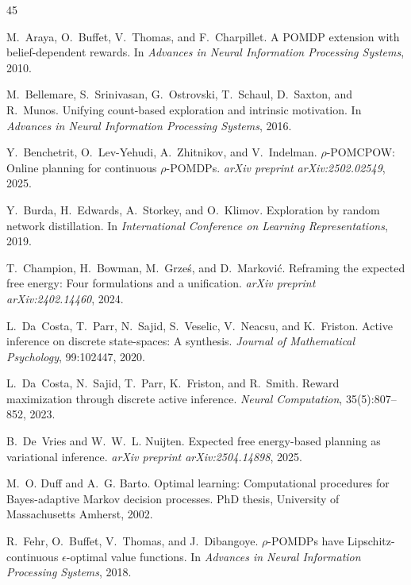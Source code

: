 \documentclass[runningheads]{llncs}
\begin{document}
\begin{thebibliography}{45}

M.~Araya, O.~Buffet, V.~Thomas, and F.~Charpillet.
\newblock A {POMDP} extension with belief-dependent rewards.
\newblock In \emph{Advances in Neural Information Processing Systems}, 2010.

M.~Bellemare, S.~Srinivasan, G.~Ostrovski, T.~Schaul, D.~Saxton, and R.~Munos.
\newblock Unifying count-based exploration and intrinsic motivation.
\newblock In \emph{Advances in Neural Information Processing Systems}, 2016.

Y.~Benchetrit, O.~Lev-Yehudi, A.~Zhitnikov, and V.~Indelman.
\newblock $\rho$-{POMCPOW}: Online planning for continuous $\rho$-{POMDP}s.
\newblock \emph{arXiv preprint arXiv:2502.02549}, 2025.

Y.~Burda, H.~Edwards, A.~Storkey, and O.~Klimov.
\newblock Exploration by random network distillation.
\newblock In \emph{International Conference on Learning Representations}, 2019.

T.~Champion, H.~Bowman, M.~Grze\'{s}, and D.~Markovi\'{c}.
\newblock Reframing the expected free energy: Four formulations and a unification.
\newblock \emph{arXiv preprint arXiv:2402.14460}, 2024.

L.~Da~Costa, T.~Parr, N.~Sajid, S.~Veselic, V.~Neacsu, and K.~Friston.
\newblock Active inference on discrete state-spaces: A synthesis.
\newblock \emph{Journal of Mathematical Psychology}, 99:102447, 2020.

L.~Da~Costa, N.~Sajid, T.~Parr, K.~Friston, and R.~Smith.
\newblock Reward maximization through discrete active inference.
\newblock \emph{Neural Computation}, 35(5):807--852, 2023.

B.~De~Vries and W.~W.~L. Nuijten.
\newblock Expected free energy-based planning as variational inference.
\newblock \emph{arXiv preprint arXiv:2504.14898}, 2025.

M.~O. Duff and A.~G. Barto.
\newblock Optimal learning: Computational procedures for {B}ayes-adaptive {M}arkov decision processes.
\newblock PhD thesis, University of Massachusetts Amherst, 2002.

R.~Fehr, O.~Buffet, V.~Thomas, and J.~Dibangoye.
\newblock $\rho$-{POMDP}s have {L}ipschitz-continuous $\epsilon$-optimal value functions.
\newblock In \emph{Advances in Neural Information Processing Systems}, 2018.


\end{thebibliography}
\end{document}

